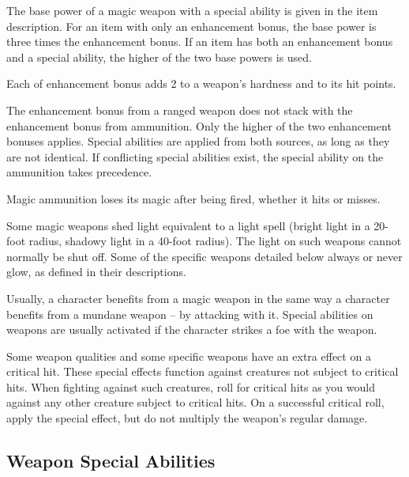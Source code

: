              The base power of a magic weapon with a special ability is given in the item description.
            For an item with only an enhancement bonus, the base power is three times the enhancement bonus.
            If an item has both an enhancement bonus and a special ability, the higher of the two base powers is used.

             Each  of enhancement bonus adds 2 to a weapon's hardness and  to its hit points.

             The enhancement bonus from a ranged weapon does not stack with the enhancement bonus from ammunition.
            Only the higher of the two enhancement bonuses applies.
            Special abilities are applied from both sources, as long as they are not identical.
            If conflicting special abilities exist, the special ability on the ammunition takes precedence.

            Magic ammunition loses its magic after being fired, whether it hits or misses.

             Some magic weapons shed light equivalent to a light spell (bright light in a 20-foot radius, shadowy light in a 40-foot radius).
            The light on such weapons cannot normally be shut off.
            Some of the specific weapons detailed below always or never glow, as defined in their descriptions.

             Usually, a character benefits from a magic weapon in the same way a character benefits from a mundane weapon -- by attacking with it.
            Special abilities on weapons are usually activated if the character strikes a foe with the weapon.

             Some weapon qualities and some specific weapons have an extra effect on a critical hit.
            These special effects function against creatures not subject to critical hits.
            When fighting against such creatures, roll for critical hits as you would against any other creature subject to critical hits.
            On a successful critical roll, apply the special effect, but do not multiply the weapon's regular damage.

    \subsection{Weapon Special Abilities}\label{Weapon Special Abilities}

